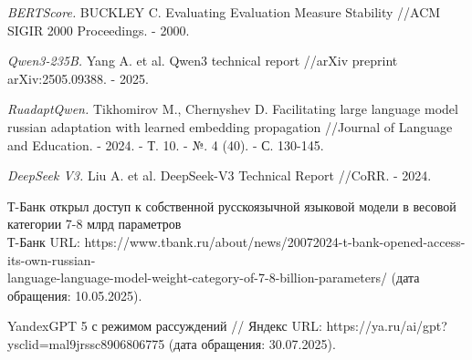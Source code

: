 \documentclass{superfri}
\begin{document}
\begin{thebibliography}{99}
\textit{BERTScore.}
BUCKLEY C. Evaluating Evaluation Measure Stability //ACM SIGIR 2000 Proceedings. - 2000.

\textit{Qwen3-235B.}
Yang A. et al. Qwen3 technical report //arXiv preprint arXiv:2505.09388. - 2025.

\textit{RuadaptQwen.}
Tikhomirov M., Chernyshev D. Facilitating large language model russian adaptation with learned embedding propagation //Journal of Language and Education. - 2024. - Т. 10. - №. 4 (40). - С. 130-145.

\textit{DeepSeek V3.}
Liu A. et al. DeepSeek-V3 Technical Report //CoRR. - 2024.

Т-Банк открыл доступ к собственной русскоязычной языковой модели в весовой категории 7-8 млрд параметров\\ Т-Банк URL: https://www.tbank.ru/about/news/20072024-t-bank-opened-access-its-own-russian-\\language-language-model-weight-category-of-7-8-billion-parameters/ (дата обращения: 10.05.2025).

YandexGPT 5 с режимом рассуждений // Яндекс URL: https://ya.ru/ai/gpt?ysclid=mal9jrssc8906806775 (дата обращения: 30.07.2025).

\end{thebibliography}
\end{document}
